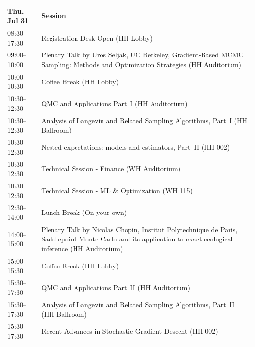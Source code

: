 \documentclass[12pt,lettersize,oneside]{book} %
\begin{document}
\begin{table}
{\footnotesize
\begin{tabularx}{\textwidth}{>{\hsize=0.32\hsize}X|>{\hsize=1.7\hsize}X}
\hline
\textbf{Thu, Jul 31} & \textbf{Session} \\
\hline
\cellcolor{\EmptyColor}08:30--17:30 & \cellcolor{\EmptyColor}Registration Desk Open (HH Lobby) \\
\cellcolor{\PlenaryColor}09:00--10:00 & \cellcolor{\PlenaryColor}Plenary Talk by Uros Seljak, UC Berkeley, Gradient-Based MCMC Sampling: Methods and Optimization Strategies (HH Auditorium) \\
\cellcolor{\EmptyColor}10:00--10:30 & \cellcolor{\EmptyColor}Coffee Break (HH Lobby) \\
\cellcolor{\SessionTitleColor}10:30--12:30 & \cellcolor{\SessionTitleColor}QMC and Applications Part~I (HH Auditorium) \\
\cellcolor{\SessionTitleColor}10:30--12:30 & \cellcolor{\SessionTitleColor}Analysis of Langevin and Related Sampling Algorithms, Part~I (HH Ballroom) \\
\cellcolor{\SessionTitleColor}10:30--12:30 & \cellcolor{\SessionTitleColor}Nested expectations: models and estimators, Part~II (HH 002) \\
\cellcolor{\SessionLightColor}10:30--12:30 & \cellcolor{\SessionLightColor}Technical Session - Finance (WH Auditorium) \\
\cellcolor{\SessionLightColor}10:30--12:30 & \cellcolor{\SessionLightColor}Technical Session - ML \& Optimization (WH 115) \\
\cellcolor{\EmptyColor}12:30--14:00 & \cellcolor{\EmptyColor}Lunch Break (On your own) \\
\cellcolor{\PlenaryColor}14:00--15:00 & \cellcolor{\PlenaryColor}Plenary Talk by Nicolas Chopin, Institut Polytechnique de Paris, Saddlepoint Monte Carlo and its application to exact ecological inference (HH Auditorium) \\
\cellcolor{\EmptyColor}15:00--15:30 & \cellcolor{\EmptyColor}Coffee Break (HH Lobby) \\
\cellcolor{\SessionTitleColor}15:30--17:30 & \cellcolor{\SessionTitleColor}QMC and Applications Part~II (HH Auditorium) \\
\cellcolor{\SessionTitleColor}15:30--17:30 & \cellcolor{\SessionTitleColor}Analysis of Langevin and Related Sampling Algorithms, Part~II (HH Ballroom) \\
\cellcolor{\SessionTitleColor}15:30--17:30 & \cellcolor{\SessionTitleColor}Recent Advances in Stochastic Gradient Descent (HH 002) \\

\end{tabularx}}
\end{table}
\end{document}
